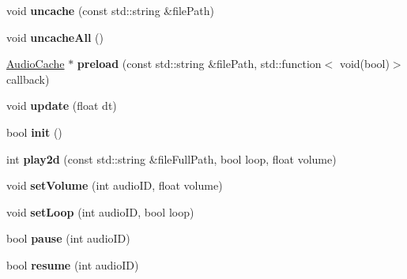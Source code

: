 \begin{DoxyCompactItemize}
void {\bfseries uncache} (const std\+::string \&file\+Path)
\item 
\mbox{\label{classexperimental_1_1AudioEngineImpl_ae439dacc5acebf311686ebf6f1f6b3df}} 
void {\bfseries uncache\+All} ()
\item 
\mbox{\label{classexperimental_1_1AudioEngineImpl_a220cb2755bcaa7d4ae17e2740a9abf8c}} 
\hyperlink{classexperimental_1_1AudioCache}{Audio\+Cache} $\ast$ {\bfseries preload} (const std\+::string \&file\+Path, std\+::function$<$ void(bool)$>$ callback)
\item 
\mbox{\label{classexperimental_1_1AudioEngineImpl_a0aa9187ac5e5341a505cf6154feceaee}} 
void {\bfseries update} (float dt)
\item 
\mbox{\label{classexperimental_1_1AudioEngineImpl_a908e5136201a8a6b53ae5c292329f82b}} 
bool {\bfseries init} ()
\item 
\mbox{\label{classexperimental_1_1AudioEngineImpl_a04b788a8319f5d7f90e297a2a345f745}} 
int {\bfseries play2d} (const std\+::string \&file\+Full\+Path, bool loop, float volume)
\item 
\mbox{\label{classexperimental_1_1AudioEngineImpl_aaa11ae7fe8bfd4c4365c02aa71f119b0}} 
void {\bfseries set\+Volume} (int audio\+ID, float volume)
\item 
\mbox{\label{classexperimental_1_1AudioEngineImpl_afd6600a03fa747d44c79f09fbc41b373}} 
void {\bfseries set\+Loop} (int audio\+ID, bool loop)
\item 
\mbox{\label{classexperimental_1_1AudioEngineImpl_a4b7cd4c0f622f263dee4f8067cc364a1}} 
bool {\bfseries pause} (int audio\+ID)
\item 
\mbox{\label{classexperimental_1_1AudioEngineImpl_a300f339e4c5178c84522fe8654898e43}} 
bool {\bfseries resume} (int audio\+ID)
\item 

\end{DoxyCompactItemize}

